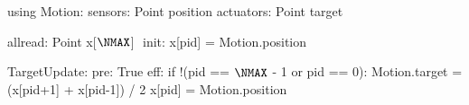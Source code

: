 using Motion:
  sensors: Point position
  actuators: Point target

allread: Point x[$\NMAX$] $\label{lineform-allread}$
init:
  x[pid] = Motion.position

TargetUpdate:
  pre: True
  eff:
    if !(pid == $\NMAX$ - 1 or pid == 0):
      Motion.target = (x[pid+1] + x[pid-1]) / 2
      x[pid] = Motion.position